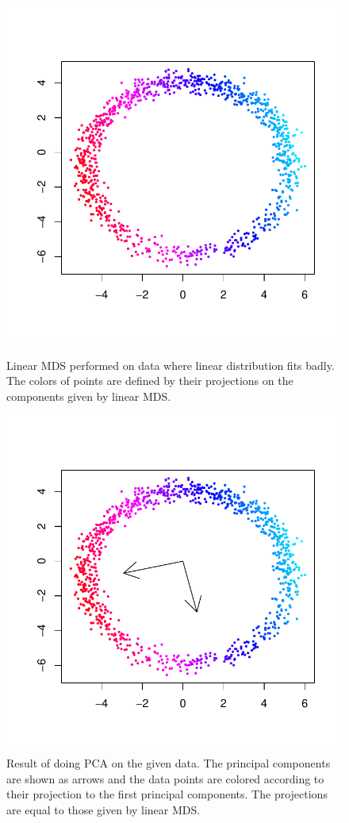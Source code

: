 \documentclass{article}
\begin{document}
\begin{figure}\begin{minipage}{0.4\columnwidth}\centering
	\includegraphics[scale=0.6]{mds}
	\caption{Linear MDS performed on data where linear distribution fits badly. The colors of points are defined by their projections on the components given by linear MDS.}\label{fig:mds}
\end{minipage}\hfil\begin{minipage}{0.4\columnwidth}\centering
	\includegraphics[scale=0.6]{mdspca}
	\caption{Result of doing PCA on the given data. The principal components are shown as arrows and the data points are colored according to their projection to the first principal components. The projections are equal to those given by linear MDS.}\label{fig:mdspca}
\end{minipage}\end{figure}
\end{document}
